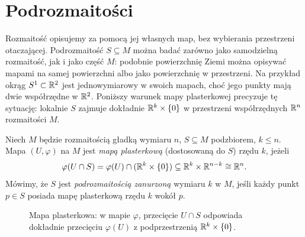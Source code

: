 \section{Podrozmaitości}

Rozmaitość opisujemy za pomocą jej własnych map, bez wybierania
przestrzeni otaczającej. Podrozmaitość $S\subseteq M$ można badać
zarówno jako samodzielną rozmaitość, jak i jako część $M$:
podobnie powierzchnię Ziemi można opisywać mapami na samej powierzchni
albo jako powierzchnię w przestrzeni. Na przykład okrąg
$S^1\subset\mathbb{R}^2$ jest jednowymiarowy w swoich mapach, choć jego
punkty mają dwie współrzędne w $\mathbb{R}^2$. Poniższy warunek mapy
plasterkowej precyzuje tę sytuację: lokalnie $S$ zajmuje dokładnie
$\mathbb{R}^k\times\{0\}$ w przestrzeni współrzędnych $\mathbb{R}^n$ rozmaitości $M$.

\begin{definicja}
Niech $M$ będzie rozmaitością gładką wymiaru $n$, $S\subseteq M$ podzbiorem, $k\leq n$.
Mapa $(U,\varphi)$ na $M$ jest \emph{mapą plasterkową} (dostosowaną do $S$) rzędu $k$,
jeżeli
\[
\varphi(U\cap S)=\varphi(U)\cap(\mathbb{R}^k\times\{0\})\subseteq\mathbb{R}^k\times\mathbb{R}^{n-k}\cong\mathbb{R}^n.
\]
Mówimy, że $S$ jest \emph{podrozmaitością zanurzoną} wymiaru $k$ w $M$, jeśli każdy punkt
$p\in S$ posiada mapę plasterkową rzędu $k$ wokół $p$.
\end{definicja}

\begin{figure}[h]
\centering
{}
\caption{Mapa plasterkowa: w mapie $\varphi$, przecięcie $U\cap S$ odpowiada dokładnie
przecięciu $\varphi(U)$ z podprzestrzenią $\mathbb{R}^k\times\{0\}$.}
\label{fig:plasterek}
\end{figure}

